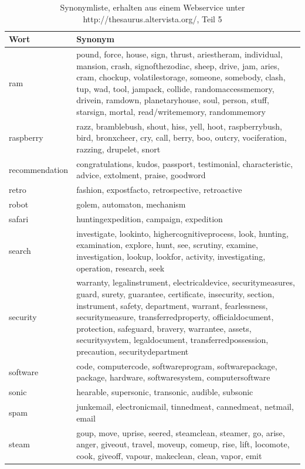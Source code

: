 \documentclass[12pt,a4paper]{report}
\begin{document}
	\begin{table}[H]
\caption{Synonymliste, erhalten aus einem Webservice unter http://thesaurus.altervista.org/, Teil 5 }
\begin{center}
\begin{tabular}{ |l|p{13cm}|}
\hline
\textbf{Wort} & \textbf{Synonym}\\
\hline

ram & pound, force, house, sign, thrust, ariestheram, individual, mansion, crash, signofthezodiac, sheep, drive, jam, aries, cram, chockup, volatilestorage, someone, somebody, clash, tup, wad, tool, jampack, collide, randomaccessmemory, drivein, ramdown, planetaryhouse, soul, person, stuff, starsign, mortal, read/writememory, randommemory\\
\hline
raspberry & razz, bramblebush, shout, hiss, yell, hoot, raspberrybush, bird, bronxcheer, cry, call, berry, boo, outcry, vociferation, razzing, drupelet, snort\\
\hline
recommendation & congratulations, kudos, passport, testimonial, characteristic, advice, extolment, praise, goodword\\
\hline
retro & fashion, expostfacto, retrospective, retroactive\\
\hline
robot & golem, automaton, mechanism\\
\hline
safari & huntingexpedition, campaign, expedition\\
\hline
search & investigate, lookinto, highercognitiveprocess, look, hunting, examination, explore, hunt, see, scrutiny, examine, investigation, lookup, lookfor, activity, investigating, operation, research, seek\\
\hline
security & warranty, legalinstrument, electricaldevice, securitymeasures, guard, surety, guarantee, certificate, insecurity, section, instrument, safety, department, warrant, fearlessness, securitymeasure, transferredproperty, officialdocument, protection, safeguard, bravery, warrantee, assets, securitysystem, legaldocument, transferredpossession, precaution, securitydepartment\\
\hline
software & code, computercode, softwareprogram, softwarepackage, package, hardware, softwaresystem, computersoftware\\
\hline
sonic & hearable, supersonic, transonic, audible, subsonic\\
\hline
spam & junkemail, electronicmail, tinnedmeat, cannedmeat, netmail, email\\
\hline
steam & goup, move, uprise, seered, steamclean, steamer, go, arise, anger, giveout, travel, moveup, comeup, rise, lift, locomote, cook, giveoff, vapour, makeclean, clean, vapor, emit\\

\end{tabular}
\end{center}
\end{table}
\end{document}
